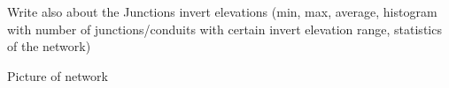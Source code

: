 

Write also about the Junctions invert elevations (min, max, average, histogram with number of junctions/conduits with certain invert elevation range, statistics of the network)

Picture of network